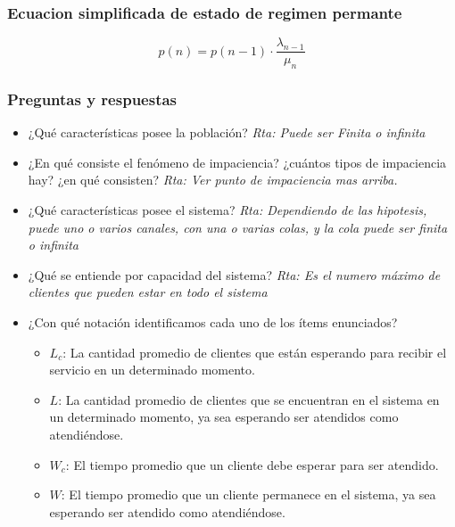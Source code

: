 \documentclass{article}
\begin{document}
\subsubsection{Ecuacion simplificada de estado de regimen permante}

\begin{equation}
    p(n)= p(n-1) \cdot \frac{ \lambda_{n-1}}{\mu_n}
\end{equation}



\newpage
\subsubsection{Preguntas y respuestas}
\begin{itemize}
    \item ¿Qué características posee la población?
        \newline\textit{Rta: Puede ser Finita o infinita}
    \item ¿En qué consiste el fenómeno de impaciencia? ¿cuántos tipos de impaciencia hay? ¿en qué consisten?
        \newline\textit{Rta: Ver punto de impaciencia mas arriba.}
    \item ¿Qué características posee el sistema?
        \newline\textit{Rta: Dependiendo de las hipotesis, puede uno o varios canales, con una o varias colas, y la cola puede ser finita o infinita}
    \item ¿Qué se entiende por capacidad del sistema?
        \newline\textit{Rta: Es el numero máximo de clientes que pueden estar en todo el sistema}
    \item ¿Con qué notación identificamos cada uno de los ítems enunciados?
        \begin{itemize}
            \item \(L_c\): La cantidad promedio de clientes que están esperando para recibir el servicio en un determinado momento.
            \item \(L\): La cantidad promedio de clientes que se encuentran en el sistema en un determinado momento, ya sea esperando ser atendidos como atendiéndose.
            \item \(W_c\): El tiempo promedio que un cliente debe esperar para ser atendido.
            \item \(W\): El tiempo promedio que un cliente permanece en el sistema, ya sea esperando ser atendido como atendiéndose.

\end{itemize}
\end{itemize}
\end{document}
